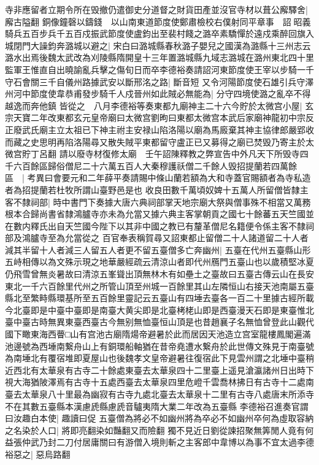 寺非應留者立期令所在毁撤仍遣御史分道督之財貨田產並沒官寺材以葺公廨驛舍|{
	廨古隘翻}
銅像鐘磬以鑄錢　以山南東道節度使鄭肅檢校右僕射同平章事　詔昭義騎兵五百步兵千五百戍振武節度使盧鈞出至裴村餞之潞卒素驕憚於遠戍乘醉回旗入城閉門大譟鈞奔潞城以避之|{
	宋白曰潞城縣春秋潞子嬰兒之國漢為潞縣十三州志云潞水出焉後魏太武改為刈陵縣隋開皇十三年置潞城縣九域志潞城在潞州東北四十里}
監軍王惟直自出曉諭亂兵擊之傷旬日而卒李德裕奏請詔河東節度使王宰以步騎一千守石會關三千自儀州路據武安以斷邢洺之路|{
	斷音短}
又令河陽節度使石雄引兵守澤州河中節度使韋恭甫發步騎千人戍晉州如此賊必無能為|{
	分守四境使潞之亂卒不得越逸而奔他鎮}
皆從之　八月李德裕等奏東都九廟神主二十六今貯於太微宫小屋|{
	玄宗天寶二年改東都玄元皇帝廟曰太微宫劉昫曰東都太微宫本武后家廟神龍初中宗反正廢武氏廟主立太祖已下神主祔主安禄山陷洛陽以廟為馬廄棄其神主協律郎嚴郢收而藏之史思明再陷洛陽尋又散失賊平東都留守盧正已又募得之廟已焚毁乃寄主於太微宫貯丁呂翻}
請以廢寺材復修太廟　壬午詔陳釋教之弊宣告中外凡天下所毁寺四千六百餘區歸俗僧尼二十六萬五百人大秦穆護祅僧二千餘人毁招提蘭若四萬餘區　|{
	考異曰會要元和二年薛平奏請賜中條山蘭若額為大和寺蓋官賜額者為寺私造者為招提蘭若杜牧所謂山臺野邑是也}
收良田數千萬頃奴婢十五萬人所留僧皆隸主客不隸祠部|{
	時中書門下奏據大唐六典祠部掌天地宗廟大祭與僧事殊不相當又萬務根本合歸尚書省隸鴻臚寺亦未為允當又據六典主客掌朝貢之國七十餘蕃五天竺國並在數内釋氏出自天竺國今陛下以其非中國之教已有釐革僧尼名籍便令係主客不隸祠部及鴻臚寺至為允當從之}
百官奉表稱賀尋又詔東都止留僧二十人諸道留二十人者減其半留十人者減三人留五人者更不留五臺僧多亡奔幽州|{
	五臺在代州五臺縣山形五峙相傳以為文殊示現之地華嚴經疏云清涼山者即代州鴈門五臺山也以歲積堅冰夏仍飛雪曾無炎暑故曰清涼五峯聳出頂無林木有如壘土之臺故曰五臺古傳云山在長安東北一千六百餘里代州之所管山頂至州城一百餘里其山左隣恒山右接天池南屬五臺縣北至繁畤縣環基所至五百餘里靈記云五臺山有四埵去臺各一百二十里據古經所載今北臺即是中臺中臺即是南臺大黄尖即是北臺栲栳山即是西臺漫天石即是東臺惟北臺中臺古時無異東臺西臺古今無别無恤臺恒山頂是也昔趙襄子名無恤曾登此山觀代國下瞰東海西瞢□山有宫池古廟隋煬帝避暑於此而居因天池造立宫室龍樓鳳閣遍滿池邊號為西埵南繋舟山上有銅環船軸猶在昔帝堯遭水繋舟於此世傳文殊見于南臺號為南埵北有覆宿堆即夏屋山也後魏孝文皇帝避暑往復宿此下見雲州謂之北埵中臺稍近西北有太華泉有古寺二十餘處東臺去太華泉四十二里臺上遥見滄瀛諸州日出時下視大海猶陂澤焉有古寺十五處西臺去太華泉四里危嶝千雲喬林拂日有古寺十二處南臺去太華泉八十里最為幽寂有古寺九處北臺去太華泉十二里有古寺八處唐末所添寺不在其數五臺縣本漢慮虒縣慮虒音驢夷隋大業二年改為五臺縣}
李德裕召進奏官謂曰汝趣白本使|{
	趣讀曰促}
五臺僧為將必不如幽州將為卒必不如幽州卒何為虛取容納之名染於人口|{
	將即亮翻染如豔翻又而險翻}
獨不見近日劉從諫招聚無筭閒人竟有何益張仲武乃封二刀付居庸關曰有游僧入境則斬之主客郎中韋博以為事不宜太過李德裕惡之|{
	惡烏路翻}
